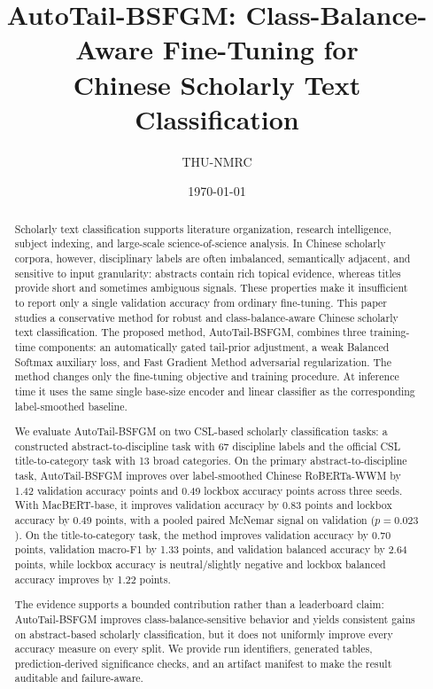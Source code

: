 \documentclass[10pt]{article}
\title{AutoTail-BSFGM: Class-Balance-Aware Fine-Tuning for\\
Chinese Scholarly Text Classification}
\author{THU-NMRC}
\date{\today}
\begin{document}
\maketitle

\begin{abstract}
Scholarly text classification supports literature organization, research intelligence, subject indexing, and large-scale science-of-science analysis. In Chinese scholarly corpora, however, disciplinary labels are often imbalanced, semantically adjacent, and sensitive to input granularity: abstracts contain rich topical evidence, whereas titles provide short and sometimes ambiguous signals. These properties make it insufficient to report only a single validation accuracy from ordinary fine-tuning. This paper studies a conservative method for robust and class-balance-aware Chinese scholarly text classification. The proposed method, AutoTail-BSFGM, combines three training-time components: an automatically gated tail-prior adjustment, a weak Balanced Softmax auxiliary loss, and Fast Gradient Method adversarial regularization. The method changes only the fine-tuning objective and training procedure. At inference time it uses the same single base-size encoder and linear classifier as the corresponding label-smoothed baseline.

We evaluate AutoTail-BSFGM on two CSL-based scholarly classification tasks: a constructed abstract-to-discipline task with 67 discipline labels and the official CSL title-to-category task with 13 broad categories. On the primary abstract-to-discipline task, AutoTail-BSFGM improves over label-smoothed Chinese RoBERTa-WWM by 1.42 validation accuracy points and 0.49 lockbox accuracy points across three seeds. With MacBERT-base, it improves validation accuracy by 0.83 points and lockbox accuracy by 0.49 points, with a pooled paired McNemar signal on validation ($p=0.023$). On the title-to-category task, the method improves validation accuracy by 0.70 points, validation macro-F1 by 1.33 points, and validation balanced accuracy by 2.64 points, while lockbox accuracy is neutral/slightly negative and lockbox balanced accuracy improves by 1.22 points.

The evidence supports a bounded contribution rather than a leaderboard claim: AutoTail-BSFGM improves class-balance-sensitive behavior and yields consistent gains on abstract-based scholarly classification, but it does not uniformly improve every accuracy measure on every split. We provide run identifiers, generated tables, prediction-derived significance checks, and an artifact manifest to make the result auditable and failure-aware.
\end{abstract}
\end{document}
